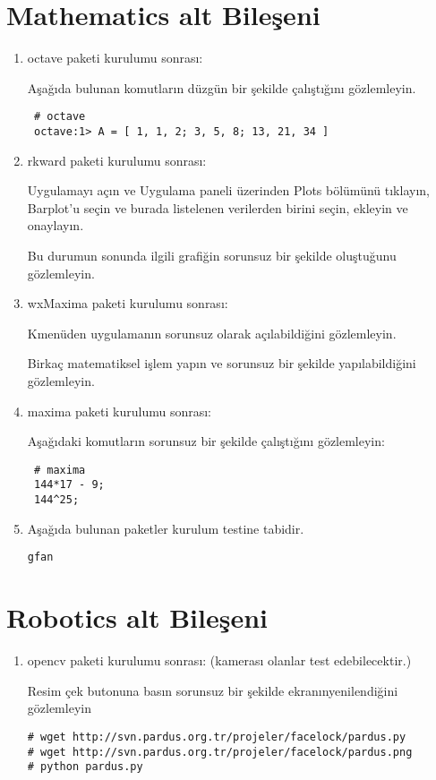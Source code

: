 \documentclass[a4paper,10pt]{article}
\begin{document}
\section{Mathematics alt Bileşeni}
\begin{enumerate}
\item octave paketi kurulumu sonrası:

Aşağıda bulunan komutların düzgün bir şekilde çalıştığını gözlemleyin.
\begin{verbatim}
 # octave 
 octave:1> A = [ 1, 1, 2; 3, 5, 8; 13, 21, 34 ]
\end{verbatim}


\item rkward paketi kurulumu sonrası:

Uygulamayı açın ve Uygulama paneli üzerinden Plots bölümünü tıklayın, Barplot'u seçin ve burada listelenen verilerden birini seçin, ekleyin ve onaylayın. 

Bu durumun sonunda ilgili grafiğin sorunsuz bir şekilde oluştuğunu gözlemleyin.

\item wxMaxima paketi kurulumu sonrası:

Kmenüden uygulamanın sorunsuz olarak açılabildiğini gözlemleyin.

Birkaç matematiksel işlem yapın ve sorunsuz bir şekilde yapılabildiğini gözlemleyin.
\item maxima paketi kurulumu sonrası:

Aşağıdaki komutların sorunsuz bir şekilde çalıştığını gözlemleyin:
\begin{verbatim}
 # maxima
 144*17 - 9;
 144^25;
\end{verbatim}

\item Aşağıda bulunan paketler kurulum testine tabidir.
\begin{verbatim}
gfan 
\end{verbatim}

\end{enumerate}

\section{Robotics alt Bileşeni}
\begin{enumerate}
 \item opencv paketi kurulumu sonrası: (kamerası olanlar test edebilecektir.)

Resim çek butonuna basın sorunsuz bir şekilde ekranınyenilendiğini gözlemleyin
\begin{verbatim}
# wget http://svn.pardus.org.tr/projeler/facelock/pardus.py
# wget http://svn.pardus.org.tr/projeler/facelock/pardus.png
# python pardus.py
\end{verbatim}


\end{enumerate}
\end{document}
